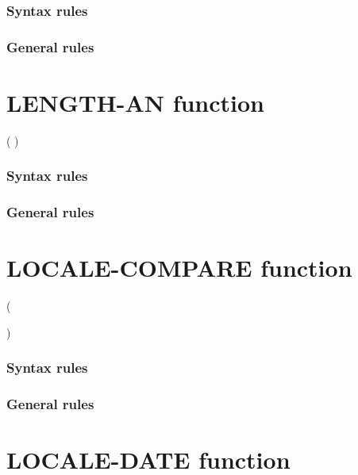 \subsubsection{Syntax rules}

\subsubsection{General rules}

\section{LENGTH-AN function}

\begin{syntax}[\miscextcolour]
    ( \argument )
\end{syntax}

\subsubsection{Syntax rules}

\subsubsection{General rules}

\section{LOCALE-COMPARE function}

\begin{syntax}
    ( \argument \argument
  \begin{0-1}
    \argument
  \end{0-1}
  )
\end{syntax}

\subsubsection{Syntax rules}

\subsubsection{General rules}

\section{LOCALE-DATE function}

